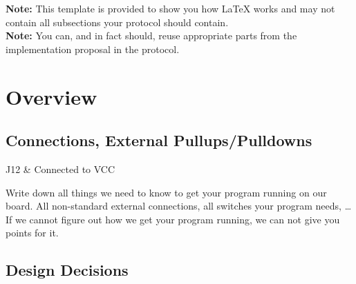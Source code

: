 \documentclass[12pt,a4paper,titlepage,oneside]{article}
\begin{document}
\MakeTitleAndTOC



\noindent
\textbf{Note:} This template is provided to show you how \LaTeX{} works and may
not contain all subsections your protocol should contain.\\
\textbf{Note:} You can, and in fact should, reuse appropriate parts
from the implementation proposal in the protocol.


\section{Overview}

\subsection{Connections,  External Pullups/Pulldowns}

J12 & Connected to VCC \\
\eConnections

Write down all things we need to know to get your program running on our board.
All non-standard external connections, all switches your program needs, \dots
If we cannot figure out how we get your program running, we can not give you
	points for it.


\subsection{Design Decisions}
\end{document}
